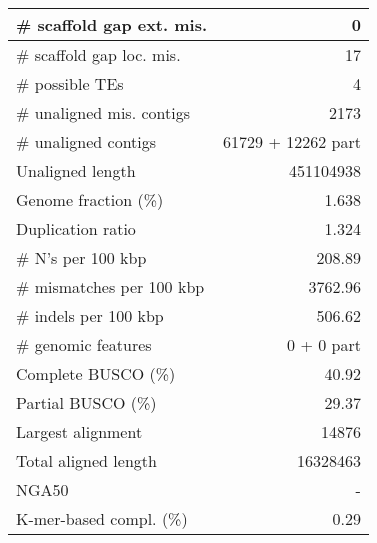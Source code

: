 \documentclass[12pt,a4paper]{article}
\begin{document}
\begin{table}[ht]
\begin{center}
\begin{tabular}{|l*{1}{|r}|}
\# scaffold gap ext. mis. & 0 \\ \hline
\# scaffold gap loc. mis. & 17 \\ \hline
\# possible TEs & 4 \\ \hline
\# unaligned mis. contigs & 2173 \\ \hline
\# unaligned contigs & 61729 + 12262 part \\ \hline
Unaligned length & 451104938 \\ \hline
Genome fraction (\%) & 1.638 \\ \hline
Duplication ratio & 1.324 \\ \hline
\# N's per 100 kbp & 208.89 \\ \hline
\# mismatches per 100 kbp & 3762.96 \\ \hline
\# indels per 100 kbp & 506.62 \\ \hline
\# genomic features & 0 + 0 part \\ \hline
Complete BUSCO (\%) & 40.92 \\ \hline
Partial BUSCO (\%) & 29.37 \\ \hline
Largest alignment & 14876 \\ \hline
Total aligned length & 16328463 \\ \hline
NGA50 & - \\ \hline
K-mer-based compl. (\%) & 0.29 \\ \hline
\end{tabular}
\end{center}
\end{table}
\end{document}
